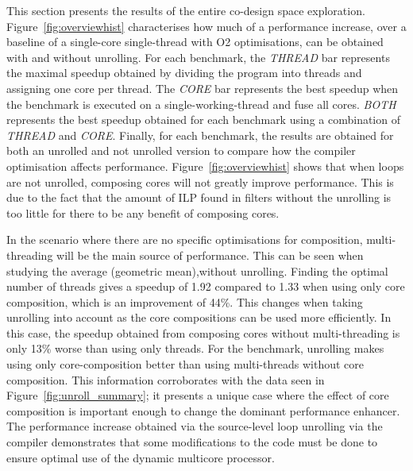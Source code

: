 This section  presents the results of the entire co-design space exploration.
Figure~\ref{fig:overviewhist} characterises how much of a performance increase, over a baseline of a single-core single-thread with O2 optimisations, can be obtained with and without unrolling.
For each benchmark, the \textit{THREAD} bar represents the maximal speedup obtained by dividing the program into threads and assigning one core per thread.
The \textit{CORE} bar represents the best speedup when the benchmark is executed on a single-working-thread and fuse all cores.
\textit{BOTH} represents the best speedup obtained for each benchmark using a combination of \textit{THREAD} and \textit{CORE}.
Finally, for each benchmark, the results are obtained for both an unrolled and not unrolled version to compare how the compiler optimisation affects performance.
Figure~\ref{fig:overviewhist} shows that when loops are not unrolled, composing cores will not greatly improve performance.
This is due to the fact that the amount of ILP found in filters without the unrolling is too little for there to be any benefit of composing cores.

In the scenario where there are no specific optimisations for composition, multi-threading will be the main source of performance.
This can be seen when studying the average (geometric mean),without unrolling.
Finding the optimal number of threads gives a speedup of 1.92 compared to 1.33 when using only core composition, which is an improvement of 44\%.
This changes when taking unrolling into account as the core compositions can be used more efficiently.
In this case, the speedup obtained from composing cores without multi-threading is only 13\% worse than using only threads.
For the  benchmark, unrolling makes using only core-composition better than using multi-threads without core composition.
This information corroborates with the data seen in Figure~\ref{fig:unroll_summary}; it presents a unique case where the effect of core composition is important enough to change the dominant performance enhancer.
The performance increase obtained via the source-level loop unrolling via the compiler demonstrates that some modifications to the code must be done to ensure optimal use of the dynamic multicore processor.

